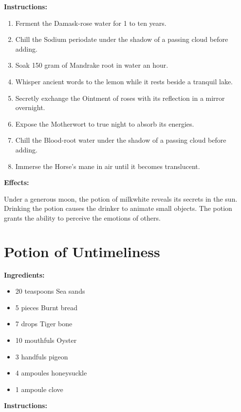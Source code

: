 \documentclass{article}
\begin{document}
\textbf{Instructions:}

\begin{enumerate}
  \item Ferment the Damask-rose water for 1 to ten years.
  \item Chill the Sodium periodate under the shadow of a passing cloud before adding.
  \item Soak 150 gram of Mandrake root in water an hour.
  \item Whisper ancient words to the lemon while it rests beside a tranquil lake.
  \item Secretly exchange the Ointment of roses with its reflection in a mirror overnight.
  \item Expose the Motherwort to true night to absorb its energies.
  \item Chill the Blood-root water under the shadow of a passing cloud before adding.
  \item Immerse the Horse's mane in air until it becomes translucent.
\end{enumerate}

\textbf{Effects:}

Under a generous moon, the potion of milkwhite reveals its secrets in the sun. Drinking the potion causes the drinker to animate small objects. The potion grants the ability to perceive the emotions of others.

\newpage
\section*{Potion of Untimeliness}

\textbf{Ingredients:}

\begin{itemize}
  \item 20 teaspoons Sea sands
  \item 5 pieces Burnt bread
  \item 7 drops Tiger bone
  \item 10 mouthfuls Oyster
  \item 3 handfuls pigeon
  \item 4 ampoules honeysuckle
  \item 1 ampoule clove
\end{itemize}

\textbf{Instructions:}
\end{document}
